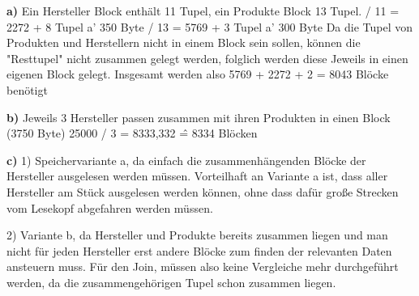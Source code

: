 \documentclass[12pt]{article}
\begin{document}
\textbf{a)}  Ein Hersteller Block enthält 11 Tupel, ein Produkte Block 13 Tupel.
 / 11 =  2272 + 8 Tupel a' 350 Byte  / 13 =  5769 + 3 Tupel a' 300 Byte \newline
Da die Tupel von Produkten und Herstellern nicht in einem Block sein sollen, können die "Resttupel" nicht zusammen gelegt werden, folglich werden diese Jeweils in einen eigenen Block gelegt.
\newline
Insgesamt werden also 5769 + 2272 + 2 = 8043 Blöcke benötigt 

\textbf{b)}  Jeweils 3 Hersteller passen zusammen mit ihren Produkten in einen Block (3750 Byte) 
25000 / 3 = 8333,332 \^= 8334 Blöcken

\textbf{c)}  1) Speichervariante a, da einfach die zusammenhängenden Blöcke der Hersteller ausgelesen werden 	müssen. Vorteilhaft an Variante a ist, dass aller Hersteller am Stück ausgelesen werden können, ohne dass dafür große Strecken vom Lesekopf abgefahren werden müssen.

2) Variante b, da Hersteller und Produkte bereits zusammen liegen und man nicht für jeden Hersteller erst andere Blöcke zum finden der relevanten Daten ansteuern muss. Für den Join, müssen also keine Vergleiche mehr durchgeführt werden, da die zusammengehörigen Tupel schon zusammen liegen.
\end{document}
